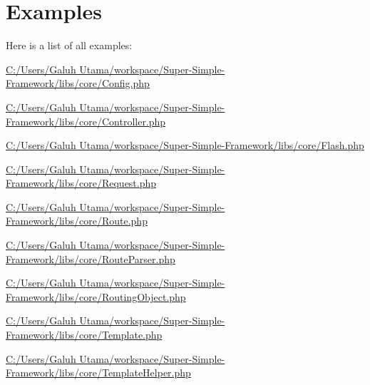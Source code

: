 \section{\-Examples}
\-Here is a list of all examples\-:\begin{DoxyCompactItemize}
\item 
\hyperlink{_c_1_2_users_2_galuh_01_utama_2workspace_2_super-_simple-_framework_2libs_2core_2_config_8php-example}{\-C\-:/\-Users/\-Galuh Utama/workspace/\-Super-\/\-Simple-\/\-Framework/libs/core/\-Config.\-php}
\item 
\hyperlink{_c_1_2_users_2_galuh_01_utama_2workspace_2_super-_simple-_framework_2libs_2core_2_controller_8php-example}{\-C\-:/\-Users/\-Galuh Utama/workspace/\-Super-\/\-Simple-\/\-Framework/libs/core/\-Controller.\-php}
\item 
\hyperlink{_c_1_2_users_2_galuh_01_utama_2workspace_2_super-_simple-_framework_2libs_2core_2_flash_8php-example}{\-C\-:/\-Users/\-Galuh Utama/workspace/\-Super-\/\-Simple-\/\-Framework/libs/core/\-Flash.\-php}
\item 
\hyperlink{_c_1_2_users_2_galuh_01_utama_2workspace_2_super-_simple-_framework_2libs_2core_2_request_8php-example}{\-C\-:/\-Users/\-Galuh Utama/workspace/\-Super-\/\-Simple-\/\-Framework/libs/core/\-Request.\-php}
\item 
\hyperlink{_c_1_2_users_2_galuh_01_utama_2workspace_2_super-_simple-_framework_2libs_2core_2_route_8php-example}{\-C\-:/\-Users/\-Galuh Utama/workspace/\-Super-\/\-Simple-\/\-Framework/libs/core/\-Route.\-php}
\item 
\hyperlink{_c_1_2_users_2_galuh_01_utama_2workspace_2_super-_simple-_framework_2libs_2core_2_route_parser_8php-example}{\-C\-:/\-Users/\-Galuh Utama/workspace/\-Super-\/\-Simple-\/\-Framework/libs/core/\-Route\-Parser.\-php}
\item 
\hyperlink{_c_1_2_users_2_galuh_01_utama_2workspace_2_super-_simple-_framework_2libs_2core_2_routing_object_8php-example}{\-C\-:/\-Users/\-Galuh Utama/workspace/\-Super-\/\-Simple-\/\-Framework/libs/core/\-Routing\-Object.\-php}
\item 
\hyperlink{_c_1_2_users_2_galuh_01_utama_2workspace_2_super-_simple-_framework_2libs_2core_2_template_8php-example}{\-C\-:/\-Users/\-Galuh Utama/workspace/\-Super-\/\-Simple-\/\-Framework/libs/core/\-Template.\-php}
\item 
\hyperlink{_c_1_2_users_2_galuh_01_utama_2workspace_2_super-_simple-_framework_2libs_2core_2_template_helper_8php-example}{\-C\-:/\-Users/\-Galuh Utama/workspace/\-Super-\/\-Simple-\/\-Framework/libs/core/\-Template\-Helper.\-php}
\end{DoxyCompactItemize}
